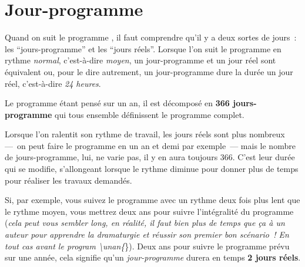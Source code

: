 % 
% 
% 
% 
% 
% 
% 
% 

\section{Jour-programme}\hypertarget{explicationjourprogrammejourreel}{}\label{explicationjourprogrammejourreel}

Quand on suit le programme \unan{}, il faut comprendre qu'il y a deux sortes de jours~{}: les ``jours-programme'' et les ``jours réels''. Lorsque l'on suit le programme en rythme \emph{normal}, c'est-à-dire \emph{moyen}, un jour-programme et un jour réel sont équivalent ou, pour le dire autrement, un jour-programme dure la durée un jour réel, c'est-à-dire \emph{24 heures}.

Le programme \unan{} étant pensé sur un an, il est décomposé en \textbf{366 jours-programme} qui tous ensemble définissent le programme complet.

Lorsque l'on ralentit son rythme de travail, les jours réels sont plus nombreux —~{}on peut faire le programme \unan{} en un an et demi par exemple~{}— mais le nombre de jours-programme, lui, ne varie pas, il y en aura toujours 366. C'est leur durée qui se modifie, s'allongeant lorsque le rythme diminue pour donner plus de temps pour réaliser les travaux demandés.

Si, par exemple, vous suivez le programme \unan{} avec un rythme deux fois plus lent que le rythme moyen, vous mettrez deux ans pour suivre l'intégralité du programme (\emph{cela peut vous sembler long, en réalité, il faut bien plus de temps que ça à un auteur pour apprendre la dramaturgie et réussir son premier bon scénario~{}! En tout cas avant le program \textbackslash{}unan\{}\}). Deux ans pour suivre le programme prévu sur une année, cela signifie qu'un \emph{jour-programme} durera en temps \textbf{2 jours réels}.


